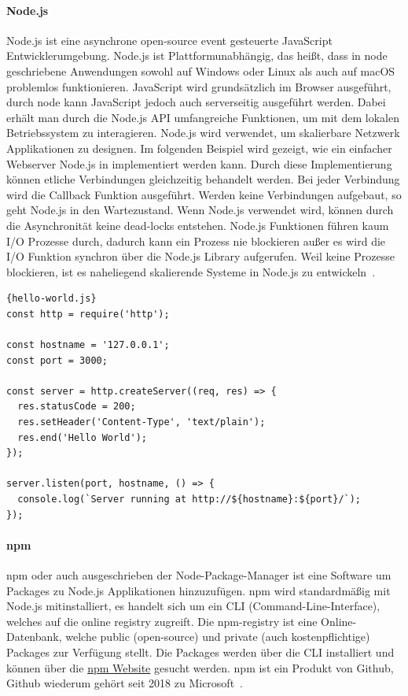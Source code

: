 \paragraph{Node.js}
\label{Node.js}
Node.js ist eine asynchrone open-source event gesteuerte JavaScript Entwicklerumgebung.
Node.js ist Plattformunabhängig, das heißt, dass in node geschriebene Anwendungen sowohl auf Windows oder Linux als auch auf macOS problemlos funktionieren.
JavaScript wird grundsätzlich im Browser ausgeführt, durch node kann JavaScript jedoch auch serverseitig ausgeführt werden.
Dabei erhält man durch die Node.js API umfangreiche Funktionen, um mit dem lokalen Betriebssystem zu interagieren.
Node.js wird verwendet, um skalierbare Netzwerk Applikationen zu designen.
Im folgenden Beispiel wird gezeigt, wie ein einfacher Webserver Node.js in implementiert werden kann.
Durch diese Implementierung können etliche Verbindungen gleichzeitig behandelt werden.
Bei jeder Verbindung wird die Callback Funktion ausgeführt.
Werden keine Verbindungen aufgebaut, so geht Node.js in den Wartezustand.
Wenn Node.js verwendet wird, können durch die Asynchronität keine dead-locks entstehen.
Node.js Funktionen führen kaum I/O Prozesse durch,
dadurch kann ein Prozess nie blockieren außer es wird die I/O Funktion synchron über die Node.js Library aufgerufen.
Weil keine Prozesse blockieren, ist es naheliegend skalierende Systeme in Node.js zu entwickeln~\cite{about-node-js}.

\begin{lstlisting}[label={lst:hello-world.js}]{hello-world.js}
const http = require('http');

const hostname = '127.0.0.1';
const port = 3000;

const server = http.createServer((req, res) => {
  res.statusCode = 200;
  res.setHeader('Content-Type', 'text/plain');
  res.end('Hello World');
});

server.listen(port, hostname, () => {
  console.log(`Server running at http://${hostname}:${port}/`);
});
\end{lstlisting}

\paragraph{npm}
npm oder auch ausgeschrieben der Node-Package-Manager ist eine Software um Packages zu Node.js Applikationen hinzuzufügen.
npm wird standardmäßig mit Node.js mitinstalliert, es handelt sich um ein CLI (Command-Line-Interface), welches auf die online registry zugreift.
Die npm-registry ist eine Online-Datenbank, welche public (open-source) und private (auch kostenpflichtige) Packages zur Verfügung stellt.
Die Packages werden über die CLI installiert und können über die \href{https://npmjs.com}{npm Website} gesucht werden.
npm ist ein Produkt von Github, Github wiederum gehört seit 2018 zu Microsoft~\cite{microsoft-acquires-github}.

